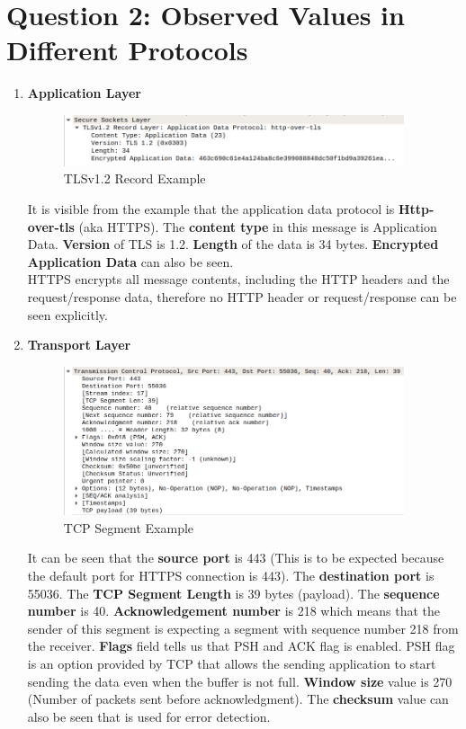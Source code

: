 \documentclass[a4paper,10pt]{article}
\newlength{\strutheight}
\begin{document}
\section*{Question 2: Observed Values in Different Protocols}
\begin{enumerate}
	\item \textbf{\color{Magenta} \large Application Layer}\\
	\begin{adjustbox}{valign=T,raise=\strutheight,minipage={\linewidth}}
		\begin{figure}
			\includegraphics[width=10cm]{Images/AppEx}
			\caption{TLSv1.2 Record Example}
		\end{figure}
		\strut{}
		It is visible from the example that the application data protocol is \textbf{Http-over-tls} (aka HTTPS). The \textbf{content type} in this message is Application Data. \textbf{Version }of TLS is 1.2. \textbf{Length} of the data is 34 bytes. \textbf{Encrypted Application Data} can also be seen. 
		\\HTTPS encrypts all message contents, including the HTTP headers and the request/response data, therefore no HTTP header or request/response can be seen explicitly.
	\end{adjustbox}
	\item \textbf{\color{Magenta} \large Transport Layer }\\
	\begin{adjustbox}{valign=T,raise=\strutheight,minipage={\linewidth}}
		\begin{figure}
			\includegraphics[width=10cm]{Images/TcpEx}
			\caption{TCP Segment Example}
		\end{figure}
		\strut{}
		It can be seen that the \textbf{source port} is 443 (This is to be expected because the default port for HTTPS connection is 443). The \textbf{destination port} is 55036. The \textbf{TCP Segment Length} is 39 bytes (payload). The \textbf{sequence number} is 40. \textbf{Acknowledgement number} is 218 which means that the sender of this segment is expecting a segment with sequence number 218 from the receiver. \textbf{Flags} field tells us that PSH and ACK flag is enabled. PSH flag is an option provided by TCP that allows the sending application to start sending the data even when the buffer is not full. \textbf{Window size} value is 270 (Number of packets sent before acknowledgment).	The \textbf{checksum} value can also be seen that is used for error detection.

\end{adjustbox}
\end{enumerate}
\end{document}
